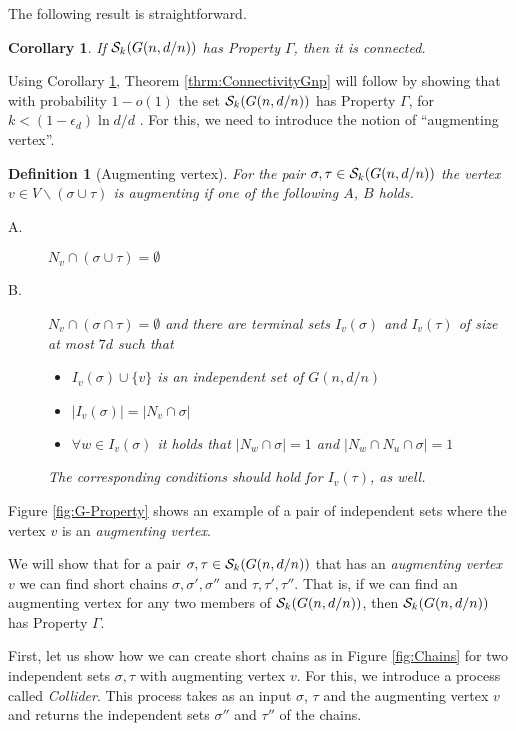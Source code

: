 \documentclass[a4paper,10pt]{article}
\newtheorem{corollary}{Corollary}\renewcommand{\thecorollary}{\arabic{corollary}}
\newtheorem{definition}{Definition}\renewcommand{\thedefinition}{\arabic{definition}}
\begin{document}
\noindent
The following result is straightforward.

\begin{corollary}\label{cor:GPropertyToConnect}
If ${\cal S}_k(G(n,d/n))$ has Property $\Gamma$, then it is connected.
\end{corollary}



\noindent
Using Corollary \ref{cor:GPropertyToConnect}, Theorem \ref{thrm:ConnectivityGnp} 
will follow by showing that with probability $1-o(1)$ the set ${\cal S}_k(G(n,d/n))$ 
has Property $\Gamma$, for $k<(1-\epsilon_d)\ln d/d$ .
For this, we need to introduce the notion of ``augmenting vertex''.



\begin{definition}[Augmenting vertex]
For the pair $\sigma, \tau \in {\cal S}_k(G(n,d/n))$ the vertex
$v \in V\backslash (\sigma \cup \tau)$ is {\em augmenting} if
one of the following $A$, $B$ holds.
\begin{description}
	\item[A.] $N_v \cap (\sigma \cup \tau)=\emptyset$
	\item[B.] $N_v \cap (\sigma \cap \tau)=\emptyset$ and there are
	 {\em terminal sets} $I_v(\sigma)$ and $I_v(\tau)$ of size at most $7d$ such that
	\begin{itemize}
		\item $I_v(\sigma)\cup\{v\}$ is an independent set of $G(n,d/n)$
		\item $|I_v(\sigma)|=|N_v\cap \sigma|$  
		\item $\forall w \in I_v(\sigma)$ it holds that $|N_w\cap \sigma|=1$ and $|N_w\cap N_u \cap \sigma|=1$
	\end{itemize}
	The corresponding conditions should hold for $I_{v}(\tau)$, as well.
\end{description}
\end{definition} 

\noindent
Figure \ref{fig:G-Property} shows an example of a pair of independent
sets where the vertex $v$ is an {\em augmenting vertex}. 


We will show that for a pair $\sigma,\tau \in {\cal S}_k(G(n,d/n))$
that has an {\em augmenting vertex $v$} we can find short chains
$\sigma, \sigma', \sigma ''$  and  $\tau, \tau', \tau''$. That is,
if we can find an augmenting vertex for any two members of ${\cal S}_k(G(n,d/n))$,
then ${\cal S}_k(G(n,d/n))$ has Property $\Gamma$.


First, let us show how  we can create  short chains as in
Figure \ref{fig:Chains} for two independent sets $\sigma,\tau$
with augmenting vertex $v$. For this, we introduce a process
called {\em Collider}.  This process takes as an input $\sigma$, 
$\tau$  and the augmenting vertex  $v$ and returns the independent
sets $\sigma''$ and $\tau''$ of the chains. \\ \vspace{-.3cm}
\end{document}
